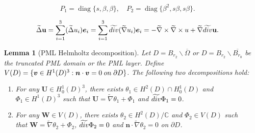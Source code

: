 \documentclass[10pt,a4paper]{amsart}
\newtheorem{lemma}{Lemma}
\providecommand{\Diag}{\operatorname{diag}}%
\newcommand{\Om}{\Omega}
\newcommand{\ba}{\backslash}
\newcommand{\bs}{\boldsymbol}
\newcommand{\dive}{{\rm div}}
\newcommand{\ov}{\overline}
\newcommand{\pa}{\partial}
\newcommand{\wid}{\widetilde}
\begin{document}
\begin{equation}\label{P1P2}
P_1=\Diag\{s,\beta,\beta\},\quad P_2=\Diag\{\beta^2,s\beta,s\beta\}.
\end{equation}

\begin{equation}\label{stretched_laplace}
\wid{\Delta}\mathbf{u}=\sum_{i=1}^3(\wid{\Delta}u_i)\bs{e}_i
=\sum_{i=1}^3\wid{\dive}(\wid{\nabla}u_i)\bs{e}_i=- \wid{\nabla}\times\wid{\nabla}\times u
+\wid{\nabla} \wid{\dive}\mathbf{u}.
\end{equation}

\begin{lemma}[PML Helmholtz decomposition]\label{PMLHD}
Let $D=B_{r_2}\ba\ov{\Om}$ or $D=B_{r_2}\ba\ov{B_{r_0}}$ be the truncated PML domain or the PML layer.
Define $V(D)=\{\bs{v}\in H^1(D)^3:\bs{n} \cdot\bs{v} =0 \;{\rm on}\;\pa D\}
$. The following two decompositions hold:
\begin{enumerate}
\item[(1)] For any $\bs{U}\in H_0^1(D)^3$, there exists $\theta_1 \in H^2(D)\cap H_0^1(D)$ and $\Phi_1\in H^1(D)^3$ 
such that $\bs{U}= \wid{\nabla}\theta_1 +\Phi_1$ and $\wid{\dive}\Phi_1=0$.
\item[(2)] For any $\bs{W}\in V(D)$, there exists $\theta_2 \in H^2(D)/\mathbb{C}$ and $\Phi_2\in V(D)$ such that 
$\bs{W}= \wid{\nabla}\theta_2 +\Phi_2$, $\wid{\dive}\Phi_2=0$ and $\bs{n}\cdot\wid{\nabla}\theta_2=0$ on $\pa D$.
\end{enumerate}
\end{lemma}
\end{document}
